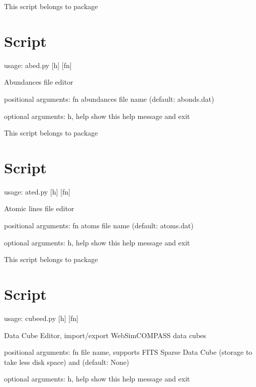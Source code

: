 \documentclass[letterpaper,10pt,english]{sphinxmanual}
\begin{document}
This script belongs to package 


\section{Script }
\label{\detokenize{autoscripts/script-abed:script-abed-py}}\label{\detokenize{autoscripts/script-abed::doc}}
\begin{sphinxVerbatim}[commandchars=\\\{\}]
usage: abed.py [\PYGZhy{}h] [fn]

Abundances file editor

positional arguments:
  fn          abundances file name (default: abonds.dat)

optional arguments:
  \PYGZhy{}h, \PYGZhy{}\PYGZhy{}help  show this help message and exit
\end{sphinxVerbatim}

This script belongs to package 


\section{Script }
\label{\detokenize{autoscripts/script-ated::doc}}\label{\detokenize{autoscripts/script-ated:script-ated-py}}
\begin{sphinxVerbatim}[commandchars=\\\{\}]
usage: ated.py [\PYGZhy{}h] [fn]

Atomic lines file editor

positional arguments:
  fn          atoms file name (default: atoms.dat)

optional arguments:
  \PYGZhy{}h, \PYGZhy{}\PYGZhy{}help  show this help message and exit
\end{sphinxVerbatim}

This script belongs to package 


\section{Script }
\label{\detokenize{autoscripts/script-cubeed:script-cubeed-py}}\label{\detokenize{autoscripts/script-cubeed::doc}}
\begin{sphinxVerbatim}[commandchars=\\\{\}]
usage: cubeed.py [\PYGZhy{}h] [fn]

Data Cube Editor, import/export WebSim\PYGZhy{}COMPASS data cubes

positional arguments:
  fn          file name, supports \PYGZsq{}FITS Sparse Data Cube (storage to take less
              disk space)\PYGZsq{} and \PYGZsq{}\PYGZsq{} (default: None)

optional arguments:
  \PYGZhy{}h, \PYGZhy{}\PYGZhy{}help  show this help message and exit
\end{sphinxVerbatim}
\end{document}
